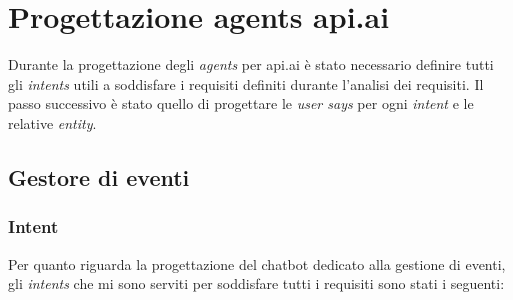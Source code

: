 \section{Progettazione agents api.ai}
Durante la progettazione degli \emph{agents} per api.ai è stato necessario definire tutti gli \emph{intents} utili a soddisfare i requisiti definiti durante l'analisi dei requisiti. Il passo successivo è stato quello di progettare le \emph{user says} per ogni \emph{intent} e le relative \emph{entity}.

\subsection{Gestore di eventi}
\subsubsection{Intent}
Per quanto riguarda la progettazione del \gls{chatbot} dedicato alla gestione di eventi, gli \emph{intents} che mi sono serviti per soddisfare tutti i requisiti sono stati i seguenti:
